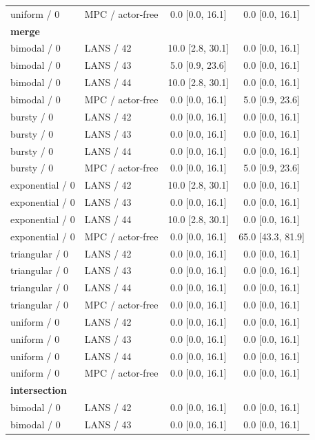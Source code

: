\begin{longtable}{llcc}
uniform / 0 & MPC / actor-free & 0.0 [0.0, 16.1] & 0.0 [0.0, 16.1] \\
\multicolumn{4}{l}{\textbf{merge}} \\
bimodal / 0 & LANS / 42 & 10.0 [2.8, 30.1] & 0.0 [0.0, 16.1] \\
bimodal / 0 & LANS / 43 & 5.0 [0.9, 23.6] & 0.0 [0.0, 16.1] \\
bimodal / 0 & LANS / 44 & 10.0 [2.8, 30.1] & 0.0 [0.0, 16.1] \\
bimodal / 0 & MPC / actor-free & 0.0 [0.0, 16.1] & 5.0 [0.9, 23.6] \\
bursty / 0 & LANS / 42 & 0.0 [0.0, 16.1] & 0.0 [0.0, 16.1] \\
bursty / 0 & LANS / 43 & 0.0 [0.0, 16.1] & 0.0 [0.0, 16.1] \\
bursty / 0 & LANS / 44 & 0.0 [0.0, 16.1] & 0.0 [0.0, 16.1] \\
bursty / 0 & MPC / actor-free & 0.0 [0.0, 16.1] & 5.0 [0.9, 23.6] \\
exponential / 0 & LANS / 42 & 10.0 [2.8, 30.1] & 0.0 [0.0, 16.1] \\
exponential / 0 & LANS / 43 & 0.0 [0.0, 16.1] & 0.0 [0.0, 16.1] \\
exponential / 0 & LANS / 44 & 10.0 [2.8, 30.1] & 0.0 [0.0, 16.1] \\
exponential / 0 & MPC / actor-free & 0.0 [0.0, 16.1] & 65.0 [43.3, 81.9] \\
triangular / 0 & LANS / 42 & 0.0 [0.0, 16.1] & 0.0 [0.0, 16.1] \\
triangular / 0 & LANS / 43 & 0.0 [0.0, 16.1] & 0.0 [0.0, 16.1] \\
triangular / 0 & LANS / 44 & 0.0 [0.0, 16.1] & 0.0 [0.0, 16.1] \\
triangular / 0 & MPC / actor-free & 0.0 [0.0, 16.1] & 0.0 [0.0, 16.1] \\
uniform / 0 & LANS / 42 & 0.0 [0.0, 16.1] & 0.0 [0.0, 16.1] \\
uniform / 0 & LANS / 43 & 0.0 [0.0, 16.1] & 0.0 [0.0, 16.1] \\
uniform / 0 & LANS / 44 & 0.0 [0.0, 16.1] & 0.0 [0.0, 16.1] \\
uniform / 0 & MPC / actor-free & 0.0 [0.0, 16.1] & 0.0 [0.0, 16.1] \\
\multicolumn{4}{l}{\textbf{intersection}} \\
bimodal / 0 & LANS / 42 & 0.0 [0.0, 16.1] & 0.0 [0.0, 16.1] \\
bimodal / 0 & LANS / 43 & 0.0 [0.0, 16.1] & 0.0 [0.0, 16.1] \\

\end{longtable}
